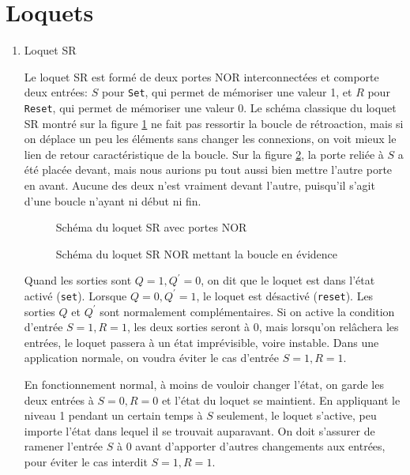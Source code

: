 \documentclass[letter, oneside]{book}
\begin{document}
\section{Loquets}
\label{sec:orge956ab2}

\begin{enumerate}
\item Loquet SR
\label{sec:orgebe7ac2}

Le loquet SR est formé de deux portes NOR interconnectées et comporte
deux entrées: \(S\) pour \texttt{Set}, qui permet de mémoriser une valeur 1,
et \(R\) pour \texttt{Reset}, qui permet de mémoriser une valeur 0. Le schéma
classique du loquet SR montré sur la figure \ref{fig:orga95543d} ne fait pas
ressortir la boucle de rétroaction, mais si on déplace un peu les
éléments sans changer les connexions, on voit mieux le lien de retour
caractéristique de la boucle. Sur la figure \ref{fig:orgfd57cb7}, la porte reliée
à \(S\) a été placée devant, mais nous aurions pu tout aussi bien
mettre l'autre porte en avant. Aucune des deux n'est vraiment devant
l'autre, puisqu'il s'agit d'une boucle n'ayant ni début ni fin.

\begin{figure}[htbp]
\centering

\caption{\label{fig:orga95543d}Schéma du loquet SR avec portes NOR}
\end{figure}


\begin{figure}[htbp]
\centering

\caption{\label{fig:orgfd57cb7}Schéma du loquet SR NOR mettant la boucle en évidence}
\end{figure}

Quand les sorties sont \(Q=1, Q^\prime=0\), on dit que le loquet est
dans l'état activé (\texttt{set}). Lorsque \(Q=0, Q^\prime=1\), le loquet
est désactivé (\texttt{reset}). Les sorties \(Q\) et \(Q^\prime\) sont
normalement complémentaires. Si on active la condition d'entrée \(S=1,
R=1\), les deux sorties seront à 0, mais lorsqu'on relâchera les
entrées, le loquet passera à un état imprévisible, voire
instable. Dans une application normale, on voudra éviter le cas
d'entrée \(S=1, R=1\). 

En fonctionnement normal, à moins de vouloir changer l'état, on garde
les deux entrées à \(S=0, R=0\) et l'état du loquet se maintient. En
appliquant le niveau 1 pendant un certain temps à \(S\) seulement, le
loquet s'active, peu importe l'état dans lequel il se trouvait
auparavant. On doit s'assurer de ramener l'entrée \(S\) à 0 avant
d'apporter d'autres changements aux entrées, pour éviter le cas
interdit \(S=1, R=1\).


\end{enumerate}
\end{document}
